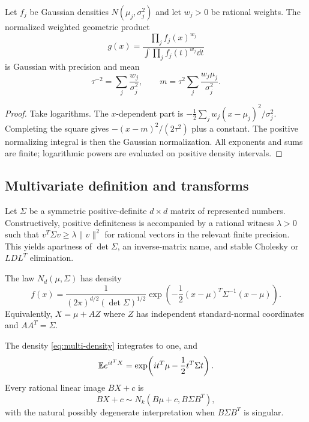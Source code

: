 \begin{proposition}\label{prop:product-densities}
Let $f_j$ be Gaussian densities $N(\mu_j,\sigma_j^2)$ and let $w_j>0$ be rational weights.  The normalized weighted geometric product
\[
 g(x)=\frac{\prod_j f_j(x)^{w_j}}
 {\int\prod_j f_j(t)^{w_j}\dd t}
\]
is Gaussian with precision and mean
\begin{equation}\label{eq:precision-pool}
 \tau^{-2}=\sum_j\frac{w_j}{\sigma_j^2},
 \qquad
 m=\tau^2\sum_j\frac{w_j\mu_j}{\sigma_j^2}.
\end{equation}
\end{proposition}

\begin{proof}
Take logarithms.  The $x$-dependent part is
$-\tfrac12\sum_jw_j(x-\mu_j)^2/\sigma_j^2$.  Completing the square gives
$-(x-m)^2/(2\tau^2)$ plus a constant.  The positive normalizing integral is then the Gaussian normalization.  All exponents and sums are finite; logarithmic powers are evaluated on positive density intervals.
\end{proof}

\subsection{Multivariate definition and transforms}

Let $\Sigma$ be a symmetric positive-definite $d\times d$ matrix of represented numbers.  Constructively, positive definiteness is accompanied by a rational witness $\lambda>0$ such that
$v^T\Sigma v\ge\lambda\|v\|^2$ for rational vectors in the relevant finite precision.  This yields apartness of $\det\Sigma$, an inverse-matrix name, and stable Cholesky or $LDL^T$ elimination.

\begin{definition}
The law $N_d(\mu,\Sigma)$ has density
\begin{equation}\label{eq:multi-density}
 f(x)=\frac{1}{(2\pi)^{d/2}(\det\Sigma)^{1/2}}
 \exp\!\left(-\frac12(x-\mu)^T\Sigma^{-1}(x-\mu)\right).
\end{equation}
Equivalently, $X=\mu+AZ$ where $Z$ has independent standard-normal coordinates and $AA^T=\Sigma$.
\end{definition}

\begin{theorem}\label{thm:multivariate-normal}
The density \eqref{eq:multi-density} integrates to one, and
\begin{equation}\label{eq:multi-cf}
 \mathbb E e^{it^TX}=\exp\!\left(it^T\mu-\frac12t^T\Sigma t\right).
\end{equation}
Every rational linear image $BX+c$ is
\begin{equation}\label{eq:multi-affine}
 BX+c\sim N_k(B\mu+c,B\Sigma B^T),
\end{equation}
with the natural possibly degenerate interpretation when $B\Sigma B^T$ is singular.
\end{theorem}

